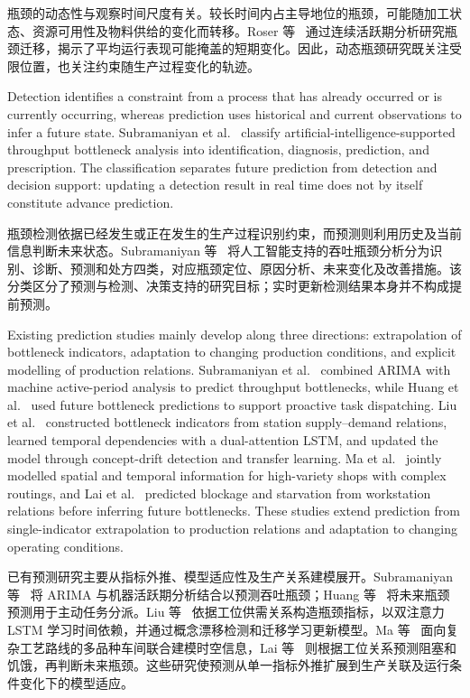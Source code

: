 \documentclass[a4paper,fleqn]{cas-dc}
\newcommand{\zhpara}[1]{%
  \par\begingroup\small\color{black!72}\noindent #1\par\endgroup}
\begin{document}
\zhpara{瓶颈的动态性与观察时间尺度有关。较长时间内占主导地位的瓶颈，可能随加工状态、资源可用性及物料供给的变化而转移。Roser 等~\cite{roser2002shifting} 通过连续活跃期分析研究瓶颈迁移，揭示了平均运行表现可能掩盖的短期变化。因此，动态瓶颈研究既关注受限位置，也关注约束随生产过程变化的轨迹。}

Detection identifies a constraint from a process that has already occurred or is currently occurring, whereas prediction uses historical and current observations to infer a future state. Subramaniyan et al.~\cite{subramaniyan2021ai} classify artificial-intelligence-supported throughput bottleneck analysis into identification, diagnosis, prediction, and prescription. The classification separates future prediction from detection and decision support: updating a detection result in real time does not by itself constitute advance prediction.

\zhpara{瓶颈检测依据已经发生或正在发生的生产过程识别约束，而预测则利用历史及当前信息判断未来状态。Subramaniyan 等~\cite{subramaniyan2021ai} 将人工智能支持的吞吐瓶颈分析分为识别、诊断、预测和处方四类，对应瓶颈定位、原因分析、未来变化及改善措施。该分类区分了预测与检测、决策支持的研究目标；实时更新检测结果本身并不构成提前预测。}

Existing prediction studies mainly develop along three directions: extrapolation of bottleneck indicators, adaptation to changing production conditions, and explicit modelling of production relations. Subramaniyan et al.~\cite{subramaniyan2018data} combined ARIMA with machine active-period analysis to predict throughput bottlenecks, while Huang et al.~\cite{huang2019proactive} used future bottleneck predictions to support proactive task dispatching. Liu et al.~\cite{liu2023lstmdam} constructed bottleneck indicators from station supply--demand relations, learned temporal dependencies with a dual-attention LSTM, and updated the model through concept-drift detection and transfer learning. Ma et al.~\cite{ma2023tusb} jointly modelled spatial and temporal information for high-variety shops with complex routings, and Lai et al.~\cite{lai2023bstan} predicted blockage and starvation from workstation relations before inferring future bottlenecks. These studies extend prediction from single-indicator extrapolation to production relations and adaptation to changing operating conditions.

\zhpara{已有预测研究主要从指标外推、模型适应性及生产关系建模展开。Subramaniyan 等~\cite{subramaniyan2018data} 将 ARIMA 与机器活跃期分析结合以预测吞吐瓶颈；Huang 等~\cite{huang2019proactive} 将未来瓶颈预测用于主动任务分派。Liu 等~\cite{liu2023lstmdam} 依据工位供需关系构造瓶颈指标，以双注意力 LSTM 学习时间依赖，并通过概念漂移检测和迁移学习更新模型。Ma 等~\cite{ma2023tusb} 面向复杂工艺路线的多品种车间联合建模时空信息，Lai 等~\cite{lai2023bstan} 则根据工位关系预测阻塞和饥饿，再判断未来瓶颈。这些研究使预测从单一指标外推扩展到生产关联及运行条件变化下的模型适应。}
\end{document}
